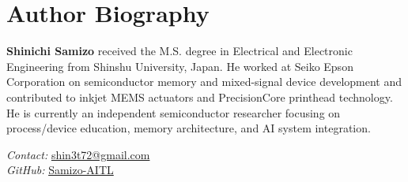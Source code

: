 \documentclass[conference]{IEEEtran}
\begin{document}
\section*{Author Biography}
\textbf{Shinichi Samizo} received the M.S. degree in Electrical and Electronic Engineering from Shinshu University, Japan.  
He worked at Seiko Epson Corporation on semiconductor memory and mixed-signal device development and contributed to inkjet MEMS actuators and PrecisionCore printhead technology.  
He is currently an independent semiconductor researcher focusing on process/device education, memory architecture, and AI system integration.  

\emph{Contact:} \href{mailto:shin3t72@gmail.com}{shin3t72@gmail.com} \\
\emph{GitHub:} \href{https://github.com/Samizo-AITL}{Samizo-AITL}
\end{document}
